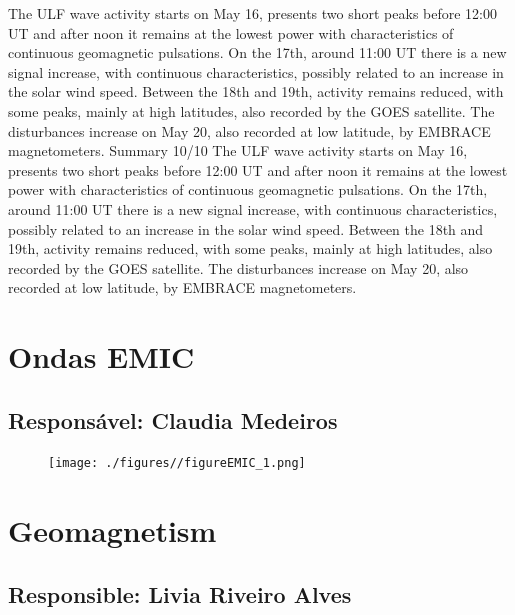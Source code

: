 \documentclass[a4paper, 10pt]{article}
\begin{document}
                        The ULF wave activity starts on May 16, presents two short peaks before
12:00 UT and after noon it remains at the lowest power with characteristics
of continuous geomagnetic pulsations. On the 17th, around 11:00 UT there is
a new signal increase, with continuous characteristics, possibly related to an
increase in the solar wind speed. Between the 18th and 19th, activity
remains reduced, with some peaks, mainly at high latitudes, also recorded
by the GOES satellite. The disturbances increase on May 20, also recorded at
low latitude, by EMBRACE magnetometers.
Summary
10/10
The ULF wave activity starts on May 16, presents two short peaks before 12:00 UT and after noon it remains at the lowest power with characteristics of continuous geomagnetic pulsations. On the 17th, around 11:00 UT there is a new signal increase, with continuous characteristics, possibly related to an increase in the solar wind speed. Between the 18th and 19th, activity remains reduced, with some peaks, mainly at high latitudes, also recorded by the GOES satellite. The disturbances increase on May 20, also recorded at low latitude, by EMBRACE magnetometers.\section{Ondas EMIC} 
 \subsection{Responsável: Claudia Medeiros} 
 
\begin{figure}[H]
    
                        \centering
   
                             \texttt{[image: ./figures//figureEMIC\_1.png]}

                        \end{figure}

                     \section{Geomagnetism} 
 \subsection{Responsible: Livia Riveiro Alves} 
 
\end{document}
